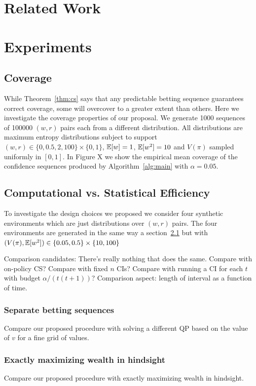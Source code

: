 \section{Related Work}
\label{sec:related}

\section{Experiments}



\subsection{Coverage} \label{sec:coverage}
While Theorem~\ref{thm:cs} says that any predictable betting sequence
guarantees correct coverage, some will overcover to a greater extent than others. Here we investigate the coverage properties of our 
proposal. We generate 1000 sequences of 100000 $(w,r)$ pairs 
each from a different distribution. All distributions are 
maximum entropy distributions subject to
support $(w,r) \in \{0, 0.5, 2, 100\} \times \{0,1\}$,
$\mathbb{E}[w]=1$, $\mathbb{E}[w^2]=10$ and $V(\pi)$ sampled uniformly 
in $[0,1]$. In Figure X we show the 
empirical mean coverage of the confidence sequences produced 
by Algorithm~\ref{alg:main} with $\alpha=0.05$. 


\subsection{Computational vs. Statistical Efficiency}
To investigate the design choices we proposed we consider
four synthetic environments which are just 
distributions over $(w,r)$ pairs. The four environments
are generated in the same way a section~\ref{sec:coverage}
but with $(V(\pi),\mathbb{E}[w^2]) \in \{0.05, 0.5\} \times \{10, 100\}$

Comparison candidates: There's really nothing that does 
the same. Compare with on-policy CS? 
Compare with fixed $n$ CIs?
Compare with running a CI for each $t$ with budget 
$\alpha/(t(t+1))$?
Comparison aspect: length of interval as a function of time.
\subsubsection{Separate betting sequences}
Compare our proposed procedure with solving a different QP based on 
the value of $v$ for a fine grid of values.
\subsubsection{Exactly maximizing wealth in hindsight}
Compare our proposed procedure with exactly maximizing wealth in hindsight.
